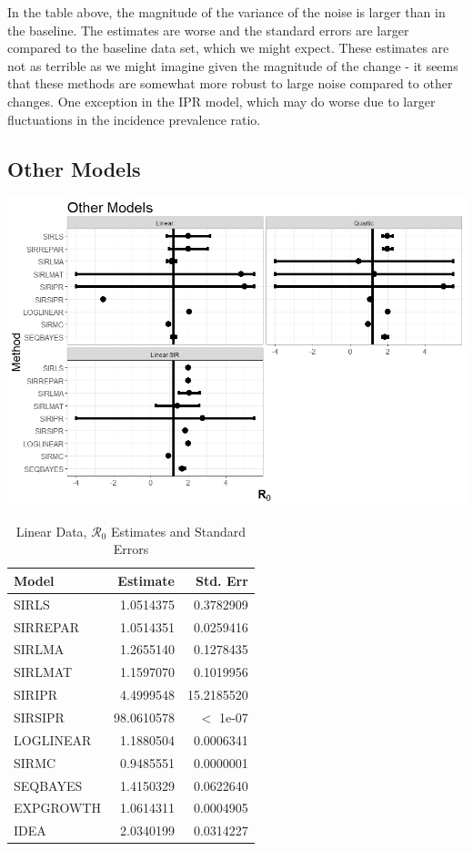 \documentclass[12pt]{article}
\newcommand{\rr}{\ensuremath{\mathcal{R}_0}}
\begin{document}
In the table above, the magnitude of the variance of the noise is larger than in the baseline. The estimates are worse and the standard errors are larger compared to the baseline data set, which we might expect. These estimates are not as terrible as we might imagine given the magnitude of the change - it seems that these methods are somewhat more robust to large noise compared to other changes. One exception in the IPR model, which may do worse due to larger fluctuations in the incidence prevalence ratio. 

\subsection{Other Models}\label{sec:res-oth}

\begin{center}
	\includegraphics[scale=0.5]{images/other.jpeg}
	
\end{center}

\begin{table}[H]

	\centering
	\begin{tabular}[t]{l|r|r}
		\hline
		Model & Estimate & Std. Err\\
		\hline
		SIRLS & 1.0514375 & 0.3782909\\
		\hline
		SIRREPAR & 1.0514351 & 0.0259416\\
		\hline
		SIRLMA & 1.2655140 & 0.1278435\\
		\hline
		SIRLMAT & 1.1597070 & 0.1019956\\
		\hline
		SIRIPR & 4.4999548 & 15.2185520\\
		\hline
		SIRSIPR & 98.0610578 & $<$ 1e-07\\
		\hline
		LOGLINEAR & 1.1880504 & 0.0006341\\
		\hline
		SIRMC & 0.9485551 & 0.0000001\\
		\hline
		SEQBAYES & 1.4150329 & 0.0622640\\
		\hline
		EXPGROWTH & 1.0614311 & 0.0004905\\
		\hline
		IDEA & 2.0340199 & 0.0314227\\
		\hline
	\end{tabular}
	\caption{Linear Data, $\rr$ Estimates and Standard Errors}\label{tab:lin-res}
\end{table}
\end{document}
